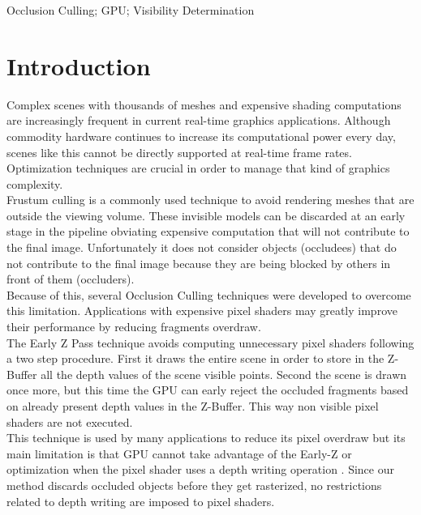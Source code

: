 \documentclass[10pt, conference]{IEEEtran}
\begin{document}
\begin{IEEEkeywords}
Occlusion Culling; GPU; Visibility Determination

\end{IEEEkeywords}


\IEEEpeerreviewmaketitle




\section{Introduction}
%
Complex scenes with thousands of meshes and expensive shading computations are increasingly frequent in current real-time graphics applications. 
Although commodity hardware continues to increase its computational power every day, scenes like this cannot be directly supported at real-time frame rates. 
Optimization techniques are crucial in order to manage that kind of graphics complexity.\\

Frustum culling is a commonly used technique to avoid rendering meshes that are outside the viewing volume. 
These invisible models can be discarded at an early stage in the pipeline obviating expensive computation that will not contribute to the final image. 
Unfortunately it does not consider objects (occludees) that do not contribute to the final image because they are being blocked by others in front of them (occluders).\\

Because of this, several Occlusion Culling techniques were developed to overcome this limitation. 
Applications with expensive pixel shaders may greatly improve their performance by reducing fragments overdraw.\\

The Early Z Pass \cite{z_pre_pass} technique avoids computing unnecessary pixel shaders following a two step procedure. 
First it draws the entire scene in order to store in the Z-Buffer all the depth values of the scene visible points. 
Second the scene is drawn once more, but this time the GPU can early reject the occluded fragments based on already present depth values in the Z-Buffer. 
This way non visible pixel shaders are not executed.\\

This technique is used by many applications to reduce its pixel overdraw but its main limitation is that GPU cannot take advantage of the Early-Z \cite{early_z} or 
\cite{HyperZ} optimization when the pixel shader uses a depth writing operation \cite{z_correct_bump_1} \cite{z_correct_bump_2}. 
Since our method discards occluded objects before they get rasterized, no restrictions related to depth writing are imposed to pixel shaders.\\
\end{document}
